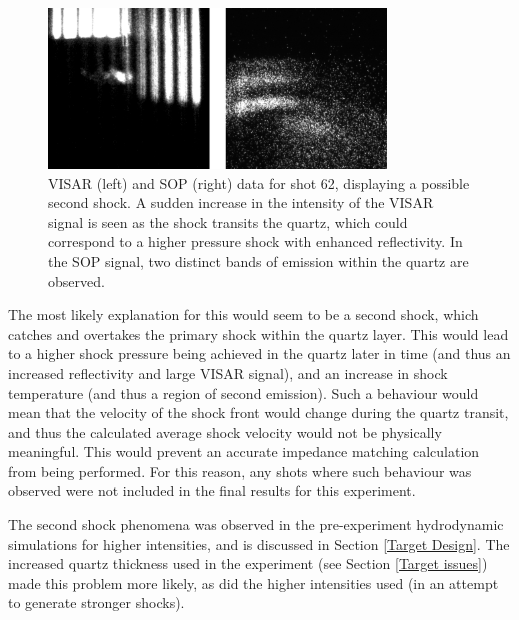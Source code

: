 \begin{figure} [h]
\begin{centering}
\includegraphics[width=0.8\textwidth]{figures/Experiment/Second Shock.png}%
\caption{\label{fig:Second Shock} VISAR (left) and SOP (right) data for shot 62, displaying a possible second shock. A sudden increase in the intensity of the VISAR signal is seen as the shock transits the quartz, which could correspond to a higher pressure shock with enhanced reflectivity. In the SOP signal, two distinct bands of emission within the quartz are observed.}
\end{centering}
\end{figure}

The most likely explanation for this would seem to be a second shock, which catches and overtakes the primary shock within the quartz layer. This would lead to a higher shock pressure being achieved in the quartz later in time (and thus an increased reflectivity and large VISAR signal), and an increase in shock temperature (and thus a region of second emission). Such a behaviour would mean that the velocity of the shock front would change during the quartz transit, and thus the calculated average shock velocity would not be physically meaningful. This would prevent an accurate impedance matching calculation from being performed. For this reason, any shots where such behaviour was observed were not included in the final results for this experiment.

The second shock phenomena was observed in the pre-experiment hydrodynamic simulations for higher intensities, and is discussed in Section \ref{Target Design}. The increased quartz thickness used in the experiment (see Section \ref{Target issues}) made this problem more likely, as did the higher intensities used (in an attempt to generate stronger shocks). 

